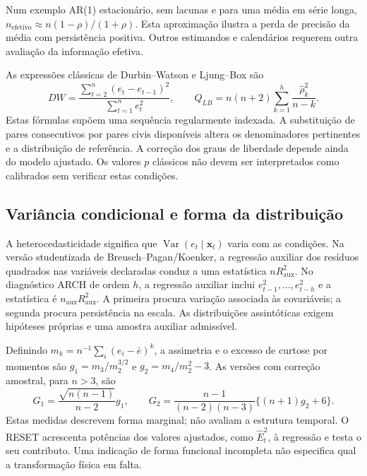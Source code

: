 Num exemplo AR(1) estacionário, sem lacunas e para uma média em série longa, $n_{\mathrm{efetivo}}\approx n(1-\rho)/(1+\rho)$. Esta aproximação ilustra a perda de precisão da média com persistência positiva. Outros estimandos e calendários requerem outra avaliação da informação efetiva.

As expressões clássicas de Durbin--Watson e Ljung--Box são
\begin{equation}
DW=\frac{\sum_{t=2}^{n}(e_t-e_{t-1})^2}{\sum_{t=1}^{n}e_t^2},
\qquad Q_{LB}=n(n+2)\sum_{k=1}^{h}\frac{\widehat\rho_k^2}{n-k}.
\label{eq:mat-dw-lb}
\end{equation}
Estas fórmulas supõem uma sequência regularmente indexada. A substituição de pares consecutivos por pares civis disponíveis altera os denominadores pertinentes e a distribuição de referência. A correção dos graus de liberdade depende ainda do modelo ajustado. Os valores $p$ clássicos não devem ser interpretados como calibrados sem verificar estas condições\parencite{BoxJenkins2015}.

\subsection{Variância condicional e forma da distribuição}
\label{sec:mat-variancia-forma}
A heterocedasticidade significa que $\operatorname{Var}(e_t\mid\boldsymbol x_t)$ varia com as condições. Na versão studentizada de Breusch--Pagan/Koenker, a regressão auxiliar dos resíduos quadrados nas variáveis declaradas conduz a uma estatística $nR_{\mathrm{aux}}^2$. No diagnóstico ARCH de ordem $h$, a regressão auxiliar inclui $e_{t-1}^2,\ldots,e_{t-h}^2$ e a estatística é $n_{\mathrm{aux}}R_{\mathrm{aux}}^2$. A primeira procura variação associada às covariáveis; a segunda procura persistência na escala. As distribuições assintóticas exigem hipóteses próprias e uma amostra auxiliar admissível.

Definindo $m_k=n^{-1}\sum_i(e_i-\bar e)^k$, a assimetria e o excesso de curtose por momentos são $g_1=m_3/m_2^{3/2}$ e $g_2=m_4/m_2^2-3$. As versões com correção amostral, para $n>3$, são
\begin{equation}
G_1=\frac{\sqrt{n(n-1)}}{n-2}g_1,
\qquad
G_2=\frac{n-1}{(n-2)(n-3)}\{(n+1)g_2+6\}.
\label{eq:mat-forma}
\end{equation}
Estas medidas descrevem forma marginal; não avaliam a estrutura temporal. O RESET acrescenta potências dos valores ajustados, como $\widehat E_t^2$, à regressão e testa o seu contributo. Uma indicação de forma funcional incompleta não especifica qual a transformação física em falta.

